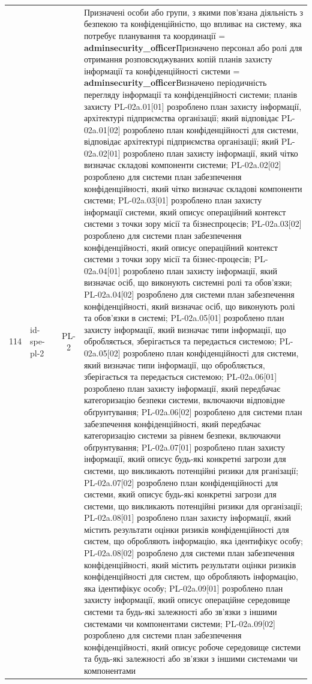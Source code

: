 \documentclass[10pt]{article}
\begin{document}
\begin{longtable}{|c|>{\raggedright\arraybackslash}p{2.5cm}|>{\raggedright\arraybackslash}p{4.5cm}|c|>{\raggedright\arraybackslash}p{4.5cm}|}
114 & id-spe-pl-2 &  & PL-2 & Призначені особи або групи, з якими пов'язана діяльність з безпекою та конфіденційністю, що впливає на систему, яка потребує планування та координації = \textbf{adminsecurity\_\allowbreak{}officer}\newline Призначено персонал або ролі для отримання розповсюджуваних копій планів захисту інформації та конфіденційності системи = \textbf{adminsecurity\_\allowbreak{}officer}\newline Визначено періодичність перегляду інформації та конфіденційності системи; планів захисту PL-02a.01[01] розроблено план захисту інформації, архітектурі підприємства організації; який відповідає PL-02a.01[02] розроблено план конфіденційності для системи, відповідає архітектурі підприємства організації; який PL-02a.02[01] розроблено план захисту інформації, який чітко визначає складові компоненти системи; PL-02a.02[02] розроблено для системи план забезпечення конфіденційності, який чітко визначає складові компоненти системи; PL-02a.03[01] розроблено план захисту інформації системи, який описує операційний контекст системи з точки зору місії та бізнеспроцесів; PL-02a.03[02] розроблено для системи план забезпечення конфіденційності, який описує операційний контекст системи з точки зору місії та бізнес-процесів; PL-02a.04[01] розроблено план захисту інформації, який визначає осіб, що виконують системні ролі та обов'язки; PL-02a.04[02] розроблено для системи план забезпечення конфіденційності, який визначає осіб, що виконують ролі та обов'язки в системі; PL-02a.05[01] розроблено план захисту інформації, який визначає типи інформації, що обробляється, зберігається та передається системою; PL-02a.05[02] розроблено план конфіденційності для системи, який визначає типи інформації, що обробляється, зберігається та передається системою; PL-02a.06[01] розроблено план захисту інформації, який передбачає категоризацію безпеки системи, включаючи відповідне обґрунтування; PL-02a.06[02] розроблено для системи план забезпечення конфіденційності, який передбачає категоризацію системи за рівнем безпеки, включаючи обґрунтування; PL-02a.07[01] розроблено план захисту інформації, який описує будь-які конкретні загрози для системи, що викликають потенційні ризики для рганізації; PL-02a.07[02] розроблено план конфіденційності для системи, який описує будь-які конкретні загрози для системи, що викликають потенційні ризики для організації; PL-02a.08[01] розроблено план захисту інформації, який містить результати оцінки ризиків конфіденційності для систем, що обробляють інформацію, яка ідентифікує особу; PL-02a.08[02] розроблено для системи план забезпечення конфіденційності, який містить результати оцінки ризиків конфіденційності для систем, що обробляють інформацію, яка ідентифікує особу; PL-02a.09[01] розроблено план захисту інформації, який описує операційне середовище системи та будь-які залежності або зв'язки з іншими системами чи компонентами системи; PL-02a.09[02] розроблено для системи план забезпечення конфіденційності, який описує робоче середовище системи та будь-які залежності або зв'язки з іншими системами чи компонентами 
\end{longtable}
\end{document}
